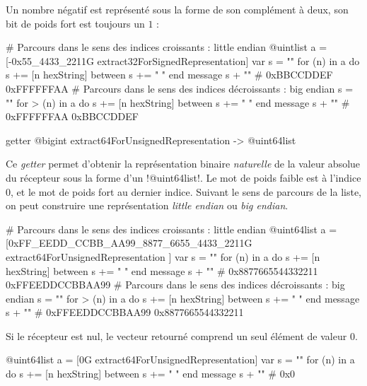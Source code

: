 Un nombre négatif est représenté sous la forme de son complément à deux, son bit de poids fort est toujours un $1$ : 

\begin{galgas}
# Parcours dans le sens des indices croissants : little endian
@uintlist a = [-0x55_4433_2211G extract32ForSignedRepresentation]
var s = ""
for (n) in a
  do s += [n hexString]
  between s += " "
end
message s + "\n" # 0xBBCCDDEF 0xFFFFFFAA
# Parcours dans le sens des indices décroissants : big endian
s = ""
for > (n) in a
  do s += [n hexString]
  between s += " "
end
message s + "\n" # 0xFFFFFFAA 0xBBCCDDEF
\end{galgas}






\begin{galgasbox}
getter @bigint extract64ForUnsignedRepresentation -> @uint64list
\end{galgasbox}

Ce \emph{getter} permet d'obtenir la représentation binaire \emph{naturelle} de la valeur absolue du récepteur sous la forme d'un \ggs!@uint64list!. Le mot de poids faible est à l'indice $0$, et le mot de poids fort au dernier indice. Suivant le sens de parcours de la liste, on peut construire une représentation \emph{little endian} ou \emph{big endian}.

\begin{galgas}
# Parcours dans le sens des indices croissants : little endian
@uint64list a = [0xFF_EEDD_CCBB_AA99_8877_6655_4433_2211G
  extract64ForUnsignedRepresentation
]
var s = ""
for (n) in a
  do s += [n hexString]
  between s += " "
end
message s + "\n" # 0x8877665544332211 0xFFEEDDCCBBAA99
# Parcours dans le sens des indices décroissants : big endian
s = ""
for > (n) in a
  do s += [n hexString]
  between s += " "
end
message s + "\n" # 0xFFEEDDCCBBAA99 0x8877665544332211
\end{galgas}

Si le récepteur est nul, le vecteur retourné comprend un seul élément de valeur $0$.

\begin{galgas}
@uint64list a = [0G extract64ForUnsignedRepresentation]
var s = ""
for (n) in a
  do s += [n hexString]
  between s += " "
end
message s + "\n" # 0x0
\end{galgas}




